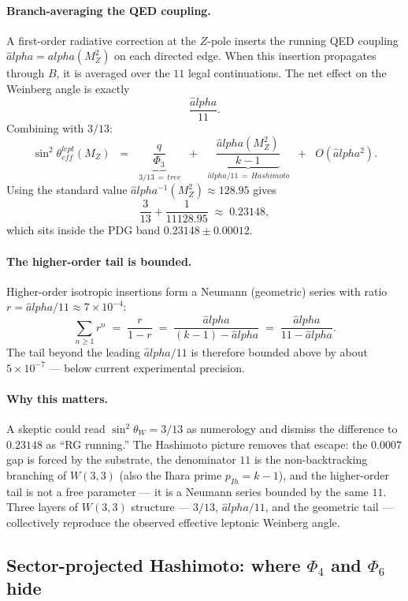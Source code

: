 \documentclass[11pt]{article}
\def\mathrm#1{#1}%
\def\text#1{#1}%
\def\alpha{alpha}%
\def\Phi#1{Phi#1}%
\def\cdot{ }%
\begin{document}
\paragraph{Branch-averaging the QED coupling.}
A first-order radiative correction at the $Z$-pole inserts the running
QED coupling $\hat\alpha = \alpha(M_Z^2)$ on each directed edge.  When
this insertion propagates through $B$, it is averaged over the
$11$ legal continuations.  The net effect on the Weinberg angle is
exactly
\[
\frac{\hat\alpha}{11}.
\]
Combining with $3/13$:
\[
\boxed{\;
\sin^2\theta_{\mathrm{eff}}^{\mathrm{lept}}(M_Z)
\;\;=\;\; \underbrace{\frac{q}{\Phi_3}}_{\,3/13\,=\,\text{tree}}
\;\;+\;\; \underbrace{\frac{\hat\alpha(M_Z^2)}{k-1}}_{\,\hat\alpha/11\,=\,\text{Hashimoto}}
\;\;+\;\; O(\hat\alpha^2).\;}
\]
Using the standard value $\hat\alpha^{-1}(M_Z^2) \approx 128.95$ gives
\[
\frac{3}{13} + \frac{1}{11 \cdot 128.95} \;\approx\; 0.23148,
\]
which sits inside the PDG band $0.23148 \pm 0.00012$.

\paragraph{The higher-order tail is bounded.}
Higher-order isotropic insertions form a Neumann (geometric) series with
ratio $r = \hat\alpha/11 \approx 7 \times 10^{-4}$:
\[
\sum_{n \ge 1} r^n \;=\; \frac{r}{1-r}
\;=\; \frac{\hat\alpha}{(k-1) - \hat\alpha} \;=\; \frac{\hat\alpha}{11 - \hat\alpha}.
\]
The tail beyond the leading $\hat\alpha/11$ is therefore bounded above
by about $5 \times 10^{-7}$ --- below current experimental precision.

\paragraph{Why this matters.}
A skeptic could read $\sin^2\theta_W = 3/13$ as numerology and dismiss
the difference to $0.23148$ as ``RG running.''  The Hashimoto picture
removes that escape: the $0.0007$ gap is forced by the substrate, the
denominator $11$ is the non-backtracking branching of $W(3,3)$ (also
the Ihara prime $p_{\mathrm{Ih}} = k-1$), and the higher-order tail is
not a free parameter --- it is a Neumann series bounded by the same
$11$.  Three layers of $W(3,3)$ structure --- $3/13$, $\hat\alpha/11$,
and the geometric tail --- collectively reproduce the observed
effective leptonic Weinberg angle.

\subsection*{Sector-projected Hashimoto: where $\Phi_4$ and $\Phi_6$ hide}
\end{document}
